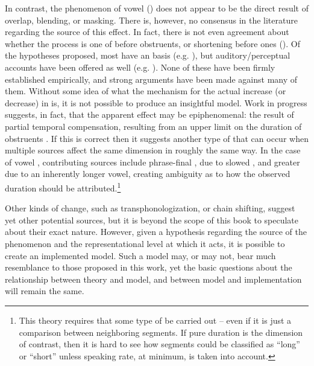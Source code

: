 In contrast, the phenomenon of vowel  ()
does not appear to be the direct result of overlap, blending, or masking.
There is, however, no consensus in the literature regarding the 
source of this effect. In fact, there is not even agreement about
whether the process is one of  before  obstruents,
or shortening before  ones (\citealt{gimson1970introduction,wells1982accents}).
Of the hypotheses proposed, most have an  basis (e.g.
\citealt{belasco1958variations,delattre1962some,chen1970vowel,lisker1974explaining,Klatt1976,moreton2004realization,schwartz2010phonology}),
but auditory/perceptual accounts have been offered as well (e.g.
\citealt{lisker1957closure,javkin1977phonetic,Kluender1988}). None
of these have been firmly established empirically, and strong arguments
have been made against many of them. Without some idea of what the
mechanism for the actual increase (or decrease) in  is, it is
not possible to produce an insightful model. Work in progress suggests,
in fact, that the apparent  effect may be epiphenomenal:
the result of partial temporal compensation, resulting from an upper
limit on the duration of  obstruents \citep{MorleySmith}.
If this is correct then it suggests another type of 
that can occur when multiple sources affect the same  dimension
in roughly the same way. In the case of vowel , contributing
sources include phrase-final ,  due to slowed
, and greater  due to an inherently longer vowel,
creating ambiguity as to how the observed duration should be attributed.\footnote{This theory requires that some type of  be carried out
– even if it is just a comparison between neighboring segments. If
pure duration is the dimension of contrast, then it is hard to see
how segments could be classified as ``long'' or ``short'' unless speaking
rate, at minimum, is taken into account.}

Other kinds of change, such as transphonologization, or chain shifting,
suggest yet other potential sources, but it is beyond the scope
of this book to speculate about their exact nature. However, given
a hypothesis regarding the source of the phenomenon and the representational
level at which it acts, it is possible to create an implemented model.
Such a model may, or may not, bear much resemblance to those proposed
in this work, yet the basic questions about the relationship between
theory and model, and between model and implementation will remain
the same. 

